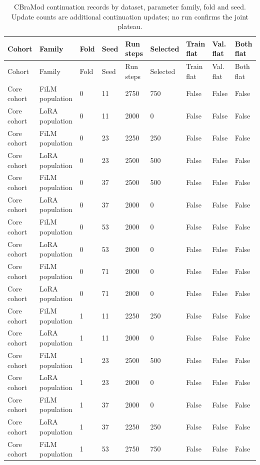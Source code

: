 \begin{longtable}{lllllllll}
\caption{CBraMod continuation records by dataset, parameter family, fold and seed. Update counts are additional continuation updates; no run confirms the joint plateau.}\label{tab:convergence}\\
\toprule
Cohort & Family & Fold & Seed & Run steps & Selected & Train flat & Val. flat & Both flat \\
\midrule
\endfirsthead
\toprule
Cohort & Family & Fold & Seed & Run steps & Selected & Train flat & Val. flat & Both flat \\
\midrule
\endhead
Core cohort & FiLM population & 0 & 11 & 2750 & 750 & False & False & False \\
Core cohort & LoRA population & 0 & 11 & 2000 & 0 & False & False & False \\
Core cohort & FiLM population & 0 & 23 & 2250 & 250 & False & False & False \\
Core cohort & LoRA population & 0 & 23 & 2500 & 500 & False & False & False \\
Core cohort & FiLM population & 0 & 37 & 2500 & 500 & False & False & False \\
Core cohort & LoRA population & 0 & 37 & 2000 & 0 & False & False & False \\
Core cohort & FiLM population & 0 & 53 & 2000 & 0 & False & False & False \\
Core cohort & LoRA population & 0 & 53 & 2000 & 0 & False & False & False \\
Core cohort & FiLM population & 0 & 71 & 2000 & 0 & False & False & False \\
Core cohort & LoRA population & 0 & 71 & 2000 & 0 & False & False & False \\
Core cohort & FiLM population & 1 & 11 & 2250 & 250 & False & False & False \\
Core cohort & LoRA population & 1 & 11 & 2000 & 0 & False & False & False \\
Core cohort & FiLM population & 1 & 23 & 2500 & 500 & False & False & False \\
Core cohort & LoRA population & 1 & 23 & 2000 & 0 & False & False & False \\
Core cohort & FiLM population & 1 & 37 & 2000 & 0 & False & False & False \\
Core cohort & LoRA population & 1 & 37 & 2250 & 250 & False & False & False \\
Core cohort & FiLM population & 1 & 53 & 2750 & 750 & False & False & False \\

\end{longtable}
